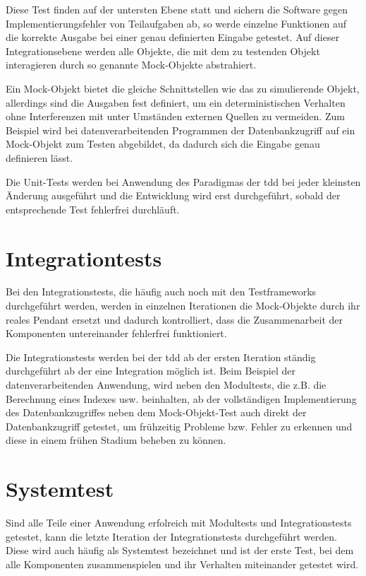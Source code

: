 \documentclass{mitschrift}
\begin{document}
Diese Test finden auf der untersten Ebene statt und sichern die Software gegen
Implementierungsfehler von Teilaufgaben ab, so werde einzelne Funktionen auf
die korrekte Ausgabe bei einer genau definierten Eingabe getestet. Auf dieser
Integrationsebene werden alle Objekte, die mit dem zu testenden Objekt
interagieren durch so genannte Mock-Objekte abstrahiert.

Ein Mock-Objekt bietet die gleiche Schnittstellen wie das zu simulierende
Objekt, allerdings sind die Ausgaben fest definiert, um ein deterministischen
Verhalten ohne Interferenzen mit unter Umständen externen Quellen zu vermeiden.
Zum Beispiel wird bei datenverarbeitenden Programmen der Datenbankzugriff auf
ein Mock-Objekt zum Testen abgebildet, da dadurch sich die Eingabe genau
definieren lässt.

Die Unit-Tests werden bei Anwendung des Paradigmas der \gls{tdd} bei jeder
kleinsten Änderung ausgeführt und die Entwicklung wird erst durchgeführt,
sobald der entsprechende Test fehlerfrei durchläuft.

\section{Integrationtests}
Bei den Integrationstests, die häufig auch noch mit den Testframeworks
durchgeführt werden, werden in einzelnen Iterationen die Mock-Objekte durch ihr
reales Pendant ersetzt und dadurch kontrolliert, dass die Zusammenarbeit der
Komponenten untereinander fehlerfrei funktioniert.

Die Integrationstests werden bei der \gls{tdd} ab der ersten Iteration ständig
durchgeführt ab der eine Integration möglich ist. Beim Beispiel der
datenverarbeitenden Anwendung, wird neben den Modultests, die z.B. die
Berechnung eines Indexes usw. beinhalten, ab der vollständigen Implementierung
des Datenbankzugriffes neben dem Mock-Objekt-Test auch direkt der
Datenbankzugriff getestet, um frühzeitig Probleme bzw. Fehler zu erkennen und
diese in einem frühen Stadium beheben zu können.

\section{Systemtest}
Sind alle Teile einer Anwendung erfolreich mit Modultests und Integrationstests
getestet, kann die letzte Iteration der Integrationstests durchgeführt werden.
Diese wird auch häufig als Systemtest bezeichnet und ist der erste Test, bei
dem alle Komponenten zusammenspielen und ihr Verhalten miteinander getestet
wird.
\end{document}
